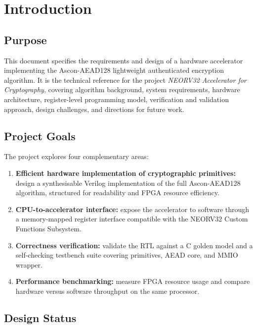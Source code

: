 \documentclass[11pt,a4paper]{article}
\begin{document}
\tableofcontents
\newpage

\section{Introduction}
\label{sec:intro}

\subsection{Purpose}

This document specifies the requirements and design of a hardware accelerator
implementing the Ascon-AEAD128 lightweight authenticated encryption algorithm.
It is the technical reference for the project \textit{NEORV32 Accelerator for
Cryptography}, covering algorithm background, system requirements, hardware
architecture, register-level programming model, verification and validation
approach, design challenges, and directions for future work.

\subsection{Project Goals}

The project explores four complementary areas:

\begin{enumerate}
  \item \textbf{Efficient hardware implementation of cryptographic primitives:}
        design a synthesisable Verilog implementation of the full
        Ascon-AEAD128 algorithm, structured for readability and FPGA resource
        efficiency.
  \item \textbf{CPU-to-accelerator interface:}
        expose the accelerator to software through a memory-mapped register
        interface compatible with the NEORV32 Custom Functions Subsystem.
  \item \textbf{Correctness verification:}
        validate the RTL against a C golden model and a self-checking
        testbench suite covering primitives, AEAD core, and MMIO wrapper.
  \item \textbf{Performance benchmarking:}
        measure FPGA resource usage and compare hardware versus software
        throughput on the same processor.
\end{enumerate}

\subsection{Design Status}
\end{document}
